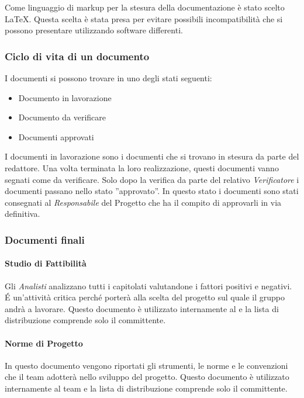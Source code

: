 Come linguaggio di markup per la stesura della documentazione  è stato
scelto \LaTeX. Questa scelta è stata presa per evitare possibili
incompatibilità che si possono presentare utilizzando software
differenti. 

\subsubsection{Ciclo di vita di un documento}

I documenti si possono trovare in uno degli stati seguenti:
\begin{itemize}
\item Documento in lavorazione
\item Documento da verificare
\item Documenti approvati
\end{itemize}

I documenti in lavorazione sono i documenti che si trovano in stesura
da parte del redattore. Una volta terminata la loro realizzazione,
questi documenti vanno segnati come da verificare.
Solo dopo la verifica da parte 
del relativo  \emph{Verificatore}  i documenti passano nello stato 
''approvato''. In questo stato i documenti sono stati consegnati al
 \emph{Responsabile}  del Progetto che ha il compito di approvarli in via
definitiva. 

\subsubsection{Documenti finali}

\paragraph{Studio di Fattibilità } 
Gli \emph{Analisti} analizzano tutti i capitolati valutandone
i fattori positivi e negativi. \'E un'attività critica perché porterà alla scelta del 
progetto sul quale il gruppo andrà a lavorare.  Questo
documento è utilizzato internamente al  e la lista di
distribuzione comprende solo il committente. 

\paragraph{Norme di Progetto }

In questo documento vengono riportati gli strumenti, le norme e le
convenzioni che il team adotterà nello sviluppo del progetto. Questo
documento è utilizzato internamente al team e la lista di
distribuzione comprende solo il committente. 

